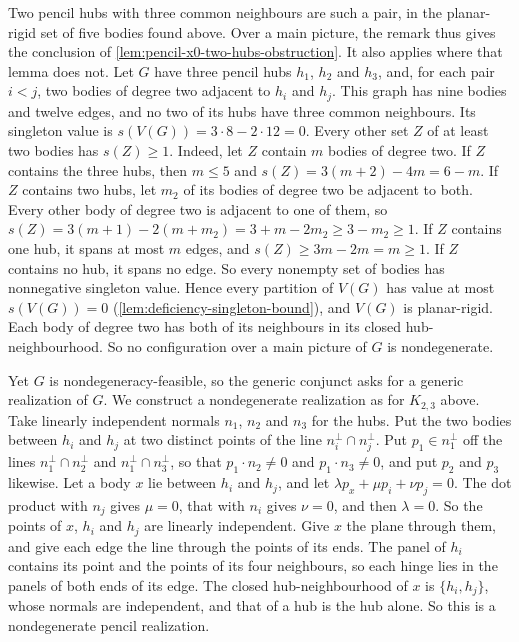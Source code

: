 \begin{remark}
  Two pencil hubs with three common neighbours are such a pair, in the
  planar-rigid set of five bodies found above. Over a main picture, the
  remark thus gives the conclusion of
  \cref{lem:pencil-x0-two-hubs-obstruction}. It also applies where that
  lemma does not. Let $G$ have three pencil hubs $h_1$, $h_2$ and $h_3$,
  and, for each pair $i < j$, two bodies of degree two adjacent to $h_i$
  and $h_j$. This graph has nine bodies and twelve edges, and no two of
  its hubs have three common neighbours. Its singleton value is
  $s(V(G)) = 3 \cdot 8 - 2 \cdot 12 = 0$. Every other set $Z$ of at least
  two bodies has $s(Z) \ge 1$. Indeed, let $Z$ contain $m$ bodies of
  degree two. If $Z$ contains the three hubs, then $m \le 5$ and
  $s(Z) = 3(m + 2) - 4m = 6 - m$. If $Z$ contains two hubs, let $m_2$ of
  its bodies of degree two be adjacent to both. Every other body of
  degree two is adjacent to one of them, so
  $s(Z) = 3(m + 1) - 2(m + m_2) = 3 + m - 2m_2 \ge 3 - m_2 \ge 1$. If $Z$
  contains one hub, it spans at most $m$ edges, and
  $s(Z) \ge 3m - 2m = m \ge 1$. If $Z$ contains no hub, it spans no edge.
  So every nonempty set of bodies has nonnegative singleton value. Hence
  every partition of $V(G)$ has value at most $s(V(G)) = 0$
  (\cref{lem:deficiency-singleton-bound}), and $V(G)$ is planar-rigid.
  Each body of degree two has both of its neighbours in its closed
  hub-neighbourhood. So no configuration over a main picture of $G$ is
  nondegenerate.

  Yet $G$ is nondegeneracy-feasible, so the generic conjunct asks for a
  generic realization of $G$. We construct a nondegenerate realization as
  for $K_{2,3}$ above. Take linearly independent normals $n_1$, $n_2$ and
  $n_3$ for the hubs. Put the two bodies between $h_i$ and $h_j$ at two
  distinct points of the line $n_i^{\perp} \cap n_j^{\perp}$. Put
  $p_1 \in n_1^{\perp}$ off the lines $n_1^{\perp} \cap n_2^{\perp}$ and
  $n_1^{\perp} \cap n_3^{\perp}$, so that $p_1 \cdot n_2 \neq 0$ and
  $p_1 \cdot n_3 \neq 0$, and put $p_2$ and $p_3$ likewise. Let a body
  $x$ lie between $h_i$ and $h_j$, and let
  $\lambda p_x + \mu p_i + \nu p_j = 0$. The dot product with $n_j$ gives
  $\mu = 0$, that with $n_i$ gives $\nu = 0$, and then $\lambda = 0$. So
  the points of $x$, $h_i$ and $h_j$ are linearly independent. Give $x$
  the plane through them, and give each edge the line through the points
  of its ends. The panel of $h_i$ contains its point and the points of its
  four neighbours, so each hinge lies in the panels of both ends of its
  edge. The closed hub-neighbourhood of $x$ is $\{h_i, h_j\}$, whose
  normals are independent, and that of a hub is the hub alone. So this is
  a nondegenerate pencil realization.


\end{remark}
